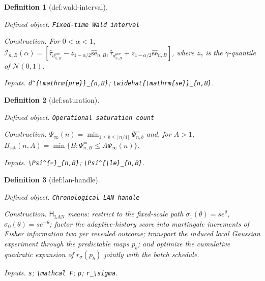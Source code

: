 \documentclass{article}
\newtheorem{definition}{Definition}
\begin{document}
\begin{definition}[def:wald-interval]\label{def:wald-interval}
\par\smallskip\noindent\emph{Defined object.} \texttt{Fixed-\allowbreak{}time Wald interval}
\par\smallskip\noindent\emph{Construction.} For \(0<\alpha<1\), \(\mathcal I_{n,B}(\alpha)=[\widehat\tau_{d^{\mathrm{pre}}_{n,B}}-z_{1-\alpha/2}\widehat{\mathrm{se}}_{n,B},\widehat\tau_{d^{\mathrm{pre}}_{n,B}}+z_{1-\alpha/2}\widehat{\mathrm{se}}_{n,B}]\), where \(z_\gamma\) is the \(\gamma\)-quantile of \(\mathcal N(0,1)\).
\par\smallskip\noindent\emph{Inputs.} \texttt{d\textasciicircum{}\{\textbackslash{}\allowbreak{}mathrm\{pre\}\allowbreak{}\}\allowbreak{}\_\allowbreak{}\{n,\allowbreak{}B\}\allowbreak{}}; \texttt{\textbackslash{}\allowbreak{}widehat\{\textbackslash{}\allowbreak{}mathrm\{se\}\allowbreak{}\}\allowbreak{}\_\allowbreak{}\{n,\allowbreak{}B\}\allowbreak{}}.
\end{definition}

\begin{definition}[def:saturation]\label{def:saturation}
\par\smallskip\noindent\emph{Defined object.} \texttt{Operational saturation count}
\par\smallskip\noindent\emph{Construction.} \(\Psi_\infty(n)=\min_{1\le b\le\lfloor n/4\rfloor}\Psi^{=}_{n,b}\) and, for \(A>1\), \(B_{\mathrm{sat}}(n,A)=\min\{B:\Psi^{=}_{n,B}\le A\Psi_\infty(n)\}\).
\par\smallskip\noindent\emph{Inputs.} \texttt{\textbackslash{}\allowbreak{}Psi\textasciicircum{}\{=\allowbreak{}\}\allowbreak{}\_\allowbreak{}\{n,\allowbreak{}B\}\allowbreak{}}; \texttt{\textbackslash{}\allowbreak{}Psi\textasciicircum{}\{\textbackslash{}\allowbreak{}le\}\allowbreak{}\_\allowbreak{}\{n,\allowbreak{}B\}\allowbreak{}}.
\end{definition}

\begin{definition}[def:lan-handle]\label{def:lan-handle}
\par\smallskip\noindent\emph{Defined object.} \texttt{Chronological LAN handle}
\par\smallskip\noindent\emph{Construction.} \(\mathsf H_{\mathrm{LAN}}\) means: restrict to the fixed-scale path \(\sigma_1(\theta)=s e^\theta\), \(\sigma_0(\theta)=s e^{-\theta}\); factor the adaptive-history score into martingale increments of Fisher information two per revealed outcome; transport the induced local Gaussian experiment through the predictable maps \(p_b\); and optimize the cumulative quadratic expansion of \(r_\sigma(p_b)\) jointly with the batch schedule.
\par\smallskip\noindent\emph{Inputs.} \texttt{s}; \texttt{\textbackslash{}\allowbreak{}mathcal F}; \texttt{p}; \texttt{r\_\allowbreak{}\textbackslash{}\allowbreak{}sigma}.
\end{definition}
\end{document}
